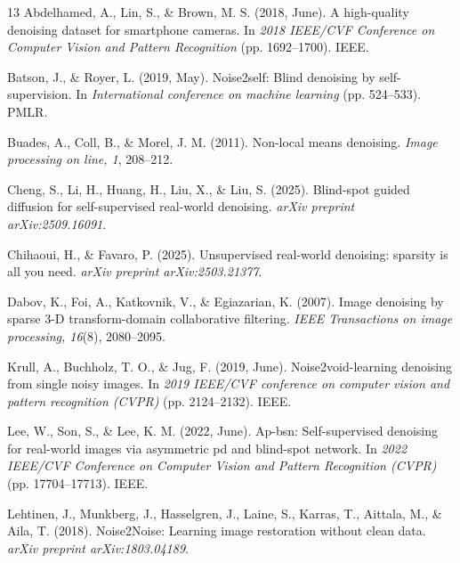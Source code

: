 \documentclass[11pt]{article}
\begin{document}
\begin{thebibliography}{13}
Abdelhamed, A., Lin, S., \& Brown, M. S. (2018, June). A high-quality denoising dataset for
smartphone cameras. In \emph{2018 IEEE/CVF Conference on Computer Vision and Pattern
Recognition} (pp. 1692--1700). IEEE.

Batson, J., \& Royer, L. (2019, May). Noise2self: Blind denoising by self-supervision.
In \emph{International conference on machine learning} (pp. 524--533). PMLR.

Buades, A., Coll, B., \& Morel, J. M. (2011). Non-local means denoising.
\emph{Image processing on line, 1}, 208--212.

Cheng, S., Li, H., Huang, H., Liu, X., \& Liu, S. (2025). Blind-spot guided diffusion for
self-supervised real-world denoising. \emph{arXiv preprint arXiv:2509.16091}.

Chihaoui, H., \& Favaro, P. (2025). Unsupervised real-world denoising: sparsity is all you
need. \emph{arXiv preprint arXiv:2503.21377}.

Dabov, K., Foi, A., Katkovnik, V., \& Egiazarian, K. (2007). Image denoising by sparse
3-D transform-domain collaborative filtering. \emph{IEEE Transactions on image processing,
16}(8), 2080--2095.

Krull, A., Buchholz, T. O., \& Jug, F. (2019, June). Noise2void-learning denoising from
single noisy images. In \emph{2019 IEEE/CVF conference on computer vision and pattern
recognition (CVPR)} (pp. 2124--2132). IEEE.

Lee, W., Son, S., \& Lee, K. M. (2022, June). Ap-bsn: Self-supervised denoising for
real-world images via asymmetric pd and blind-spot network. In \emph{2022 IEEE/CVF
Conference on Computer Vision and Pattern Recognition (CVPR)} (pp. 17704--17713). IEEE.

Lehtinen, J., Munkberg, J., Hasselgren, J., Laine, S., Karras, T., Aittala, M., \& Aila, T.
(2018). Noise2Noise: Learning image restoration without clean data.
\emph{arXiv preprint arXiv:1803.04189}.


\end{thebibliography}
\end{document}

